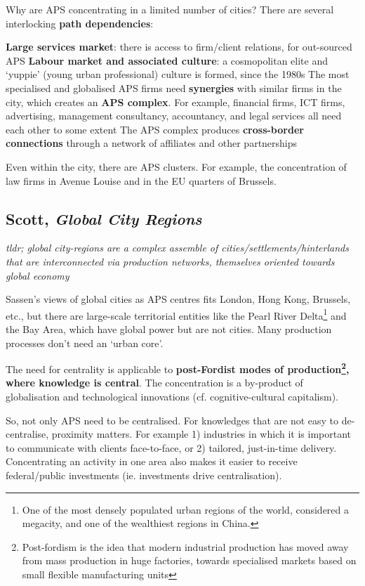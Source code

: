 \documentclass{article}
\begin{document}
Why are APS concentrating in a limited number of cities? There are several interlocking \textbf{path dependencies}:
\begin{outline}
	\1 \textbf{Large services market}: there is access to firm/client relations, for out-sourced APS
	\1 \textbf{Labour market and associated culture}: a cosmopolitan elite and `yuppie' (young urban professional) culture is formed, since the 1980s
	\1 The most specialised and globalised APS firms need \textbf{synergies} with similar firms in the city, which creates an \textbf{APS complex}. For example, financial firms, ICT firms, advertising, management consultancy, accountancy, and legal services all need each other to some extent
	\1 The APS complex produces \textbf{cross-border connections} through a network of affiliates and other partnerships
\end{outline}

Even within the city, there are APS clusters. For example, the concentration of law firms in Avenue Louise and in the EU quarters of Brussels.

\subsection{Scott, \textit{Global City Regions}}

\textit{tldr; global city-regions are a complex assemble of cities/settlements/hinterlands that are interconnected via production networks, themselves oriented towards global economy}

Sassen's views of global cities as APS centres fits London, Hong Kong, Brussels, etc., but there are large-scale territorial entities like the Pearl River Delta\footnote{One of the most densely populated urban regions of the world, considered a megacity, and one of the wealthiest regions in China.} and the Bay Area, which have global power but are not cities. Many production processes don't need an `urban core'.

The need for centrality is applicable to \textbf{post-Fordist modes of production\footnote{Post-fordism is the idea that modern industrial production has moved away from mass production in huge factories, towards specialised markets based on small flexible manufacturing units}, where knowledge is central}. The concentration is a by-product of globalisation and technological innovations (cf. cognitive-cultural capitalism). 

So, not only APS need to be centralised. For knowledges that are not easy to de-centralise, proximity matters. For example 1) industries in which it is important to communicate with clients face-to-face, or 2) tailored, just-in-time delivery. Concentrating an activity in one area also makes it easier to receive federal/public investments (ie. investments drive centralisation).
\end{document}
